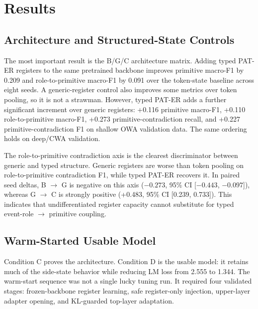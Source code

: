 \section{Results}
\label{sec:results}

\subsection{Architecture and Structured-State Controls}

The most important result is the B/G/C architecture matrix. Adding typed PAT-ER
registers to the same pretrained backbone improves primitive macro-F1 by 0.209
and role-to-primitive macro-F1 by 0.091 over the token-state baseline across
eight seeds. A generic-register control also improves some metrics over token
pooling, so it is not a strawman. However, typed PAT-ER adds a further
significant increment over generic registers: +0.116 primitive macro-F1,
+0.110 role-to-primitive macro-F1, +0.273 primitive-contradiction recall, and
+0.227 primitive-contradiction F1 on shallow OWA validation data. The same
ordering holds on deep/CWA validation.





The role-to-primitive contradiction axis is the clearest discriminator between
generic and typed structure. Generic registers are worse than token pooling on
role-to-primitive contradiction F1, while typed PAT-ER recovers it. In paired
seed deltas, B $\rightarrow$ G is negative on this axis ($-0.273$, 95\% CI
[$-0.443$, $-0.097$]), whereas G $\rightarrow$ C is strongly positive
(+0.483, 95\% CI [0.239, 0.733]). This indicates that undifferentiated register
capacity cannot substitute for typed event-role $\rightarrow$ primitive
coupling.

\subsection{Warm-Started Usable Model}

Condition C proves the architecture. Condition D is the usable model: it
retains much of the side-state behavior while reducing LM loss from 2.555 to
1.344. The warm-start sequence was not a single lucky tuning run. It required
four validated stages: frozen-backbone register learning, safe register-only
injection, upper-layer adapter opening, and KL-guarded top-layer adaptation.




